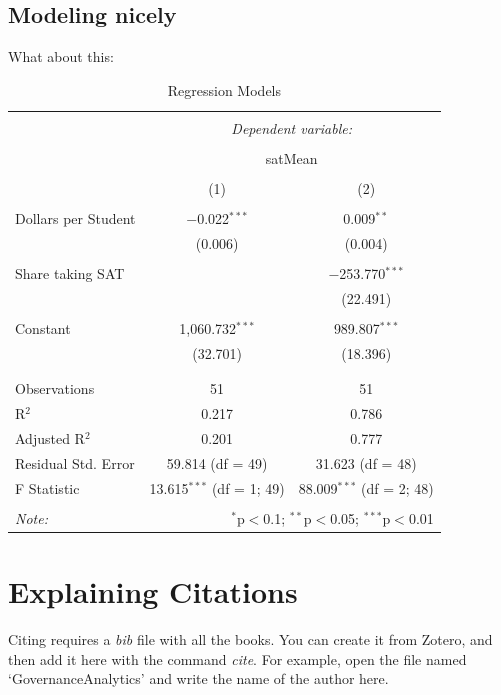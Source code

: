 \documentclass[11pt]{article}
\begin{document}
\subsection{Modeling nicely}\label{modelnice}

What about this:

\begin{table}[!htbp] \centering 
  \caption{Regression Models} 
  \label{regmods} 
\begin{tabular}{@{\extracolsep{5pt}}lcc} 
\\[-1.8ex]\hline 
\hline \\[-1.8ex] 
 & \multicolumn{2}{c}{\textit{Dependent variable:}} \\ 
\cline{2-3} 
\\[-1.8ex] & \multicolumn{2}{c}{satMean} \\ 
\\[-1.8ex] & (1) & (2)\\ 
\hline \\[-1.8ex] 
 Dollars per Student & $-$0.022$^{***}$ & 0.009$^{**}$ \\ 
  & (0.006) & (0.004) \\ 
  & & \\ 
 Share taking SAT &  & $-$253.770$^{***}$ \\ 
  &  & (22.491) \\ 
  & & \\ 
 Constant & 1,060.732$^{***}$ & 989.807$^{***}$ \\ 
  & (32.701) & (18.396) \\ 
  & & \\ 
\hline \\[-1.8ex] 
Observations & 51 & 51 \\ 
R$^{2}$ & 0.217 & 0.786 \\ 
Adjusted R$^{2}$ & 0.201 & 0.777 \\ 
Residual Std. Error & 59.814 (df = 49) & 31.623 (df = 48) \\ 
F Statistic & 13.615$^{***}$ (df = 1; 49) & 88.009$^{***}$ (df = 2; 48) \\ 
\hline 
\hline \\[-1.8ex] 
\textit{Note:}  & \multicolumn{2}{r}{$^{*}$p$<$0.1; $^{**}$p$<$0.05; $^{***}$p$<$0.01} \\ 
\end{tabular} 
\end{table} 
\clearpage

\section{Explaining Citations}\label{citation}


Citing requires a \emph{bib} file with all the books. You can create it from Zotero, and then add it here with the command \emph{cite}. For example, open the file named `GovernanceAnalytics' and write the name of the author here.

\cite{magallanes_reyes_introduction_2017}
 
\end{document}
